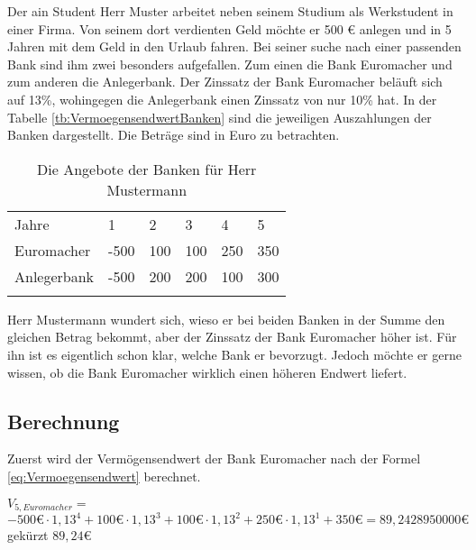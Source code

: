 Der \ac{ain} Student Herr Muster arbeitet neben seinem Studium als Werkstudent in einer Firma. Von seinem dort verdienten Geld möchte er 500 € anlegen und in 5 Jahren mit dem Geld in den Urlaub fahren. Bei seiner suche nach einer passenden Bank sind ihm zwei besonders aufgefallen. Zum einen die Bank Euromacher und zum anderen die Anlegerbank. Der Zinssatz der Bank Euromacher beläuft sich auf 13\%, wohingegen die Anlegerbank einen Zinssatz von nur 10\% hat. In der Tabelle \eqref{tb:VermoegensendwertBanken} sind die jeweiligen Auszahlungen der Banken dargestellt. Die Beträge sind in Euro zu betrachten. \pagebreak

\begin{table}[!h]
    \begin{tabular}{llllll}
        \cline{1-6} \rowcolor{gray}
        Jahre       & 1    & 2   & 3   & 4   & 5   \\ \cline{1-6} \rowcolor{white}
        Euromacher  & -500 & 100 & 100 & 250 & 350 \\ \cline{1-6} \rowcolor{white}
        Anlegerbank & -500 & 200 & 200 & 100 & 300 \\ \cline{1-6} \rowcolor{white}
    \end{tabular}
    \caption{Die Angebote der Banken für Herr Mustermann}
    \label{tb:VermoegensendwertBanken}
\end{table}

\noindent
Herr Mustermann wundert sich, wieso er bei beiden Banken in der Summe den gleichen Betrag bekommt, aber der Zinssatz der Bank Euromacher höher ist. Für ihn ist es eigentlich schon klar, welche Bank er bevorzugt. Jedoch möchte er gerne wissen, ob die Bank Euromacher wirklich einen höheren Endwert liefert.

\subsection{Berechnung}

Zuerst wird der Vermögensendwert der Bank Euromacher nach der Formel \eqref{eq:Vermoegensendwert} berechnet.

\bigskip
$V_{5, Euromacher} =$\\
\hspace*{10mm}$-500 \text{€} \cdot 1,13^4 + 100 \text{€} \cdot 1,13^3 + 100 \text{€} \cdot 1,13^2 + 250 \text{€} \cdot 1,13^1 + 350 \text{€} = 89,2428950000 \text{€}$\\
\hspace*{10mm}gekürzt $89,24 \text{€}$

